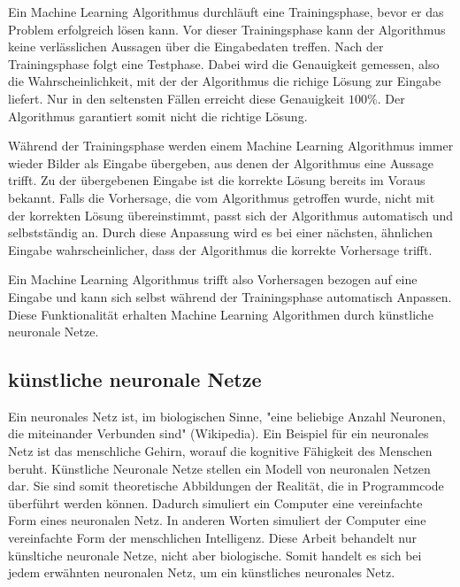 Ein Machine Learning Algorithmus durchläuft eine Trainingsphase, bevor er das
Problem erfolgreich lösen kann. Vor dieser Trainingsphase kann der Algorithmus
keine verlässlichen Aussagen über die Eingabedaten treffen. Nach der
Trainingsphase folgt eine Testphase. Dabei wird die Genauigkeit gemessen, also
die Wahrscheinlichkeit, mit der der Algorithmus die richige Lösung zur Eingabe
liefert. Nur in den seltensten Fällen erreicht diese Genauigkeit $100\%$. Der
Algorithmus garantiert somit nicht die richtige Lösung.

Während der Trainingsphase werden einem Machine Learning Algorithmus immer
wieder Bilder als Eingabe übergeben, aus denen der Algorithmus eine Aussage
trifft. Zu der übergebenen Eingabe ist die korrekte Lösung bereits
im Voraus bekannt. Falls die Vorhersage, die vom Algorithmus getroffen wurde,
nicht mit der korrekten Lösung übereinstimmt, passt sich der Algorithmus
automatisch und selbstständig an. Durch diese Anpassung wird es bei einer %
nächsten, ähnlichen Eingabe wahrscheinlicher, dass der Algorithmus die korrekte
Vorhersage trifft. 

Ein Machine Learning Algorithmus trifft also Vorhersagen bezogen auf eine
Eingabe und kann sich selbst während der Trainingsphase automatisch Anpassen.
Diese Funktionalität erhalten Machine Learning Algorithmen durch künstliche
neuronale Netze.


\subsection*{künstliche neuronale Netze}

Ein neuronales Netz ist, im biologischen Sinne, "eine beliebige Anzahl Neuronen,
die miteinander Verbunden sind" (Wikipedia). Ein Beispiel für ein neuronales
Netz ist das menschliche Gehirn, worauf die kognitive Fähigkeit des Menschen
beruht. Künstliche Neuronale Netze stellen ein Modell von neuronalen Netzen dar.
Sie sind somit theoretische Abbildungen der Realität, die in Programmcode
überführt werden können. Dadurch simuliert ein Computer eine vereinfachte Form
eines neuronalen Netz. In anderen Worten simuliert der Computer eine
vereinfachte Form der menschlichen Intelligenz. Diese Arbeit behandelt nur
künsltiche neuronale Netze, nicht aber biologische. Somit handelt es sich bei
jedem erwähnten neuronalen Netz, um ein künstliches neuronales Netz.


